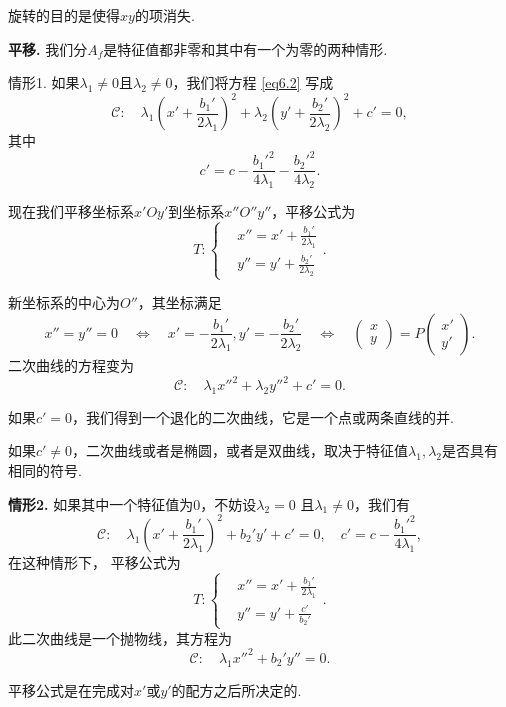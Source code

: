 \begin{nota}
  旋转的目的是使得$xy$的项消失.
\end{nota}

{\bfseries 平移.} 我们分$A_f$是特征值都非零和其中有一个为零的两种情形.

{\kaishu 情形1.} 如果$\lambda_1\ne0$且$\lambda_2\ne0$，我们将方程 \eqref{eq6.2} 写成
\[
  \mathscr C :\quad \lambda_1\left( x' + \frac{b_1'}{2\lambda_1} \right)^2 + \lambda_2
  \left( y' + \frac{b_2'}{2\lambda_2} \right)^2 + c' = 0,
\]
其中
\[
  c' = c - \frac{b_1'^2}{4\lambda_1} - \frac{b_2'^2}{4\lambda_2}.
\]

现在我们平移坐标系$x'Oy'$到坐标系$x''O''y''$，平移公式为
\[
  T:\left\{
    \begin{aligned}
      & x'' = x' + \frac{b_1'}{2\lambda_1} \\
      & y'' = y' + \frac{b_2'}{2\lambda_2}
    \end{aligned}
  \right..
\]

新坐标系的中心为$O''$，其坐标满足
\[
  x'' = y'' =0 \quad \Leftrightarrow \quad
  x' = - \frac{b_1'}{2\lambda_1},y' = - \frac{b_2'}{2\lambda_2} \quad \Leftrightarrow \quad
  \begin{pmatrix}
    x \\
    y
  \end{pmatrix} = P
  \begin{pmatrix}
    x' \\
    y'
  \end{pmatrix}.
\]
二次曲线的方程变为
\[
  \mathscr C:\quad \lambda_1x''^2 + \lambda_2y''^2 + c' = 0.
\]

如果$c'=0$，我们得到一个退化的二次曲线，它是一个点或两条直线的并.

如果$c'\ne0$，二次曲线或者是椭圆，或者是双曲线，取决于特征值$\lambda_1,\lambda_2$是否具有相同的符号.

{\bfseries 情形2.} 如果其中一个特征值为0，不妨设$\lambda_2=0$
且$\lambda_1\ne0$，我们有
\[
  \mathscr C: \quad \lambda_1 \left( x' + \frac{b_1'}{2\lambda_1} \right)^2 + b_2'y' + c' = 0,\quad c' = c - \frac{b_1'^2}{4\lambda_1},
\]
在这种情形下， 平移公式为
\[
  T: \left\{
    \begin{aligned}
      & x'' = x' + \frac{b_1'}{2\lambda_1} \\
      & y'' = y' + \frac{c'}{b_2'}
    \end{aligned}
  \right..
\]
此二次曲线是一个抛物线，其方程为
\[
  \mathscr C:\quad \lambda_1x''^2 + b_2'y'' = 0.
\]
\begin{nota}
  平移公式是在完成对$x'$或$y'$的配方之后所决定的.
\end{nota}

